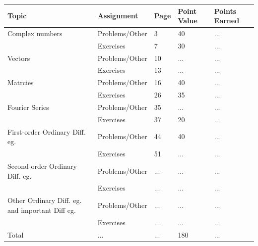 \documentclass[fleqn]{article}
\begin{document}
\begin{singlespace}
  \begin{tabular}{ |p{3cm}|||p{4cm}|p{2cm}|p{2cm}|p{2cm}|  }
      \hline
      Topic & Assignment & Page & Point Value & Points Earned \\
      \hline
      Complex numbers & \cellcolor{orange} Problems/Other & \cellcolor{orange} 3 &\cellcolor{orange}  40 &\cellcolor{orange}  ... \\
      & \cellcolor{orange} Exercises &\cellcolor{orange}  7 &\cellcolor{orange}  30 &\cellcolor{orange}  ... \\
      \hline
      Vectors & Problems/Other & 10 & ... & ... \\
      & Exercises & 13 & ... & ... \\
      \hline
      Matrcies & \cellcolor{orange} Problems/Other &\cellcolor{orange}  16 &\cellcolor{orange}  40 & \cellcolor{orange} ... \\
      & \cellcolor{orange} Exercises &\cellcolor{orange}  26 &\cellcolor{orange}  35 &\cellcolor{orange}  ... \\
      \hline
      Fourier Series & Problems/Other & 35 & ... & ... \\
      & Exercises & 37 & 20 & ... \\
      \hline
      First-order Ordinary Diff. eg.  &\cellcolor{orange} Problems/Other &\cellcolor{orange} 44 &\cellcolor{orange} 40 &\cellcolor{orange} ... \\
      & \cellcolor{orange} Exercises &\cellcolor{orange}  51 &\cellcolor{orange}  ... &\cellcolor{orange}  ... \\
      \hline
      Second-order Ordinary Diff. eg. & Problems/Other & ...  & ... & ... \\
      & Exercises & ... & ... & ... \\
      \hline
      Other Ordinary Diff. eg. and important Diff eg. &\cellcolor{orange} Problems/Other &\cellcolor{orange} ... & \cellcolor{orange}... & \cellcolor{orange}...  \\ 
      & \cellcolor{orange} Exercises &\cellcolor{orange}  ... &\cellcolor{orange}  ... &\cellcolor{orange}  ... \\ 
      \hline
      Total & ... & ... & 180 & ... \\
      \hline
  \end{tabular}
\end{singlespace}

\pagebreak

\vfill
\end{document}
